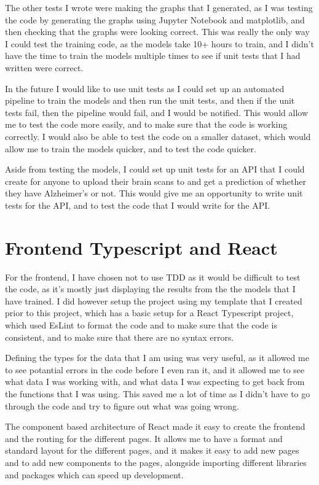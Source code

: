 \documentclass[]{final_report}
\begin{document}
The other tests I wrote were making the graphs that I generated, as I was testing the code by generating the graphs using Jupyter Notebook\cite{Jupyter} and matplotlib\cite{Matplotlib},
and then checking that the graphs were looking correct. This was really the only way I could test the training code, as the models take 10+ hours to train,
and I didn't have the time to train the models multiple times to see if unit tests that I had written were correct.

In the future I would like to use unit tests as I could set up an automated pipeline to train the models and then run the unit tests,
and then if the unit tests fail, then the pipeline would fail, and I would be notified. This would allow me to test the code more easily,
and to make sure that the code is working correctly. I would also be able to test the code on a smaller dataset, which would allow me to train the models quicker,
and to test the code quicker.

Aside from testing the models, I could set up unit tests for an API that I could create for anyone to upload their brain scans to and get a prediction of whether they have Alzheimer's or not.
This would give me an opportunity to write unit tests for the API, and to test the code that I would write for the API.

\section{Frontend Typescript and React}

For the frontend, I have chosen not to use TDD as it would be difficult to test the code, as it's mostly just displaying the results from the the models that I have trained. I did however setup the project using my template\cite{TypescriptProjectTemplate} that I created prior to this project, which has a basic setup for a React Typescript project, which used EsLint\cite{EsLint} to format the code and to make sure that the code is consistent, and to make sure that there are no syntax errors.

Defining the types for the data that I am using was very useful, as it allowed me to see potantial errors in the code before I even ran it, and it allowed me to see what data I was working with, and what data I was expecting to get back from the functions that I was using. This saved me a lot of time as I didn't have to go through the code and try to figure out what was going wrong.

The component based architecture of React made it easy to create the frontend and the routing for the different pages. It allows me to have a format and standard layout for the different pages, and it makes it easy to add new pages and to add new components to the pages, alongside importing different libraries and packages which can speed up development.
\end{document}

